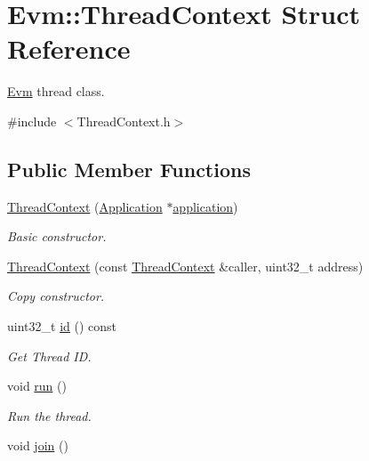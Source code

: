 \hypertarget{struct_evm_1_1_thread_context}{}\section{Evm\+:\+:Thread\+Context Struct Reference}
\label{struct_evm_1_1_thread_context}


\mbox{\hyperlink{namespace_evm}{Evm}} thread class.  




{\ttfamily \#include $<$Thread\+Context.\+h$>$}

\subsection*{Public Member Functions}
\begin{DoxyCompactItemize}
\item 
\mbox{\hyperlink{struct_evm_1_1_thread_context_acfbc6d50abd403e1d5ad80844e01cf66}{Thread\+Context}} (\mbox{\hyperlink{struct_evm_1_1_application}{Application}} $\ast$\mbox{\hyperlink{struct_evm_1_1_thread_context_ace9600627e2e504650735d1c132897ad}{application}})
\begin{DoxyCompactList}\small\item\em Basic constructor. \end{DoxyCompactList}\item 
\mbox{\hyperlink{struct_evm_1_1_thread_context_ab48faed75f15ece141cc169b9308a634}{Thread\+Context}} (const \mbox{\hyperlink{struct_evm_1_1_thread_context}{Thread\+Context}} \&caller, uint32\+\_\+t address)
\begin{DoxyCompactList}\small\item\em Copy constructor. \end{DoxyCompactList}\item 
uint32\+\_\+t \mbox{\hyperlink{struct_evm_1_1_thread_context_a55937dfacd5c99758e21d3ad1a233248}{id}} () const
\begin{DoxyCompactList}\small\item\em Get Thread ID. \end{DoxyCompactList}\item 
void \mbox{\hyperlink{struct_evm_1_1_thread_context_a1783f0f6cd523e7dc161bda3bfc1da91}{run}} ()
\begin{DoxyCompactList}\small\item\em Run the thread. \end{DoxyCompactList}\item 
void \mbox{\hyperlink{struct_evm_1_1_thread_context_a990679f6118a8ba97d1a25400768c7c8}{join}} ()

\end{DoxyCompactItemize}
